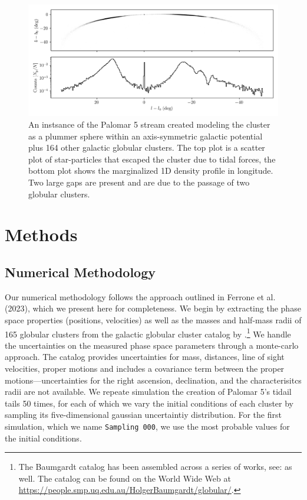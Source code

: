 \documentclass{aa}
\begin{document}
  \begin{figure}
    \centering
    \includegraphics[width=\linewidth]{stream_on_sky_Pal5_monte-carlo-009_pouliasis2017pii-GCNBody.png}
    \caption{An instsance of the Palomar 5 stream created modeling the cluster as a plummer sphere within an axis-symmetric galactic potential plus 164 other galactic globular clusters. The top plot is a scatter plot of star-particles that escaped the cluster due to tidal forces, the bottom plot shows the marginalized 1D density profile in longitude. Two large gaps are present and are due to the passage of two globular clusters.}
    \label{fig:stream_on_sky}
    \end{figure}








\section{Methods}

  \subsection{Numerical Methodology}
    Our numerical methodology follows the approach outlined in Ferrone et al. (2023), which we present here for completeness. We begin by extracting the phase space properties (positions, velocities) as well as the masses and half-mass radii of 165 globular clusters from the galactic globular cluster catalog by \cite{2021MNRAS.505.5957B}.\footnote{The Baumgardt catalog has been assembled across a series of works, see: \cite{2020PASA...37...46B,2019MNRAS.482.5138B,2018MNRAS.478.1520B} as well. The catalog can be found on the World Wide Web at \href{https://people.smp.uq.edu.au/HolgerBaumgardt/globular/}{https://people.smp.uq.edu.au/HolgerBaumgardt/globular/}.} We handle the uncertainties on the measured phase space parameters through a monte-carlo approach. The catalog provides uncertainties for mass, distances, line of sight velocities, proper motions and includes a covariance term between the proper motions---uncertainties for the right ascension, declination, and the characterisitcs radii are not available. We repeate simulation the creation of Palomar 5's tidail tails 50 times, for each of which we vary the initial conditions of each cluster by sampling its five-dimensional gaussian uncertaintiy distribution. For the first simulation, which we name \texttt{Sampling 000}, we use the most probable values for the initial conditions. 
\end{document}

